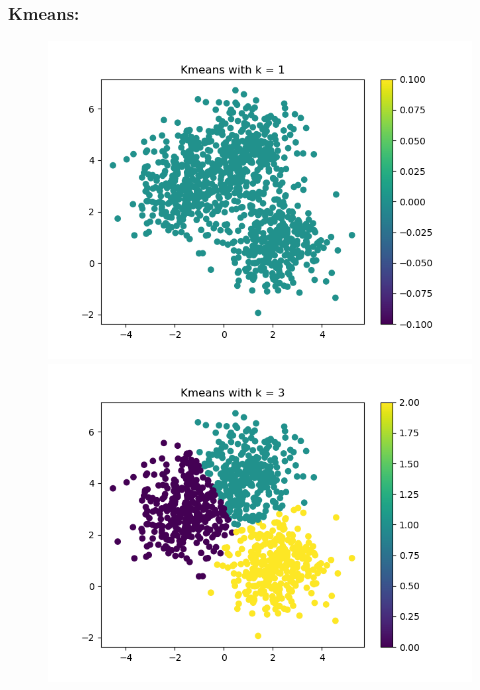 \documentclass[12pt]{article}
\begin{document}
\subsubsection*{Kmeans:}
\begin{figure}[!h]
    \begin{minipage}{0.5\textwidth}
    \centering
    \includegraphics[scale=0.4]{images/task2_dkv__k1}
    \end{minipage}
    \begin{minipage}{0.5\textwidth}
    \centering
    \includegraphics[scale=0.4]{images/task2_dkv__k3}
    \end{minipage}
    \begin{minipage}{0.5\textwidth}
    \centering

\end{minipage}
\end{figure}
\end{document}
